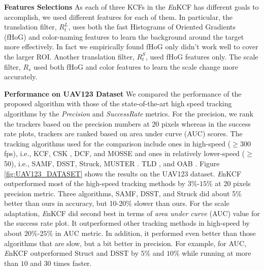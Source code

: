 \documentclass{bmvc2k}
\begin{document}
\textbf{Features Selections} As each of three KCFs in the {\it E}nKCF
has different goals to accomplish, we used different features for each
of them. In particular, the translation filter, $R_{t}^{L}$, uses both
the fast Histograms of Oriented Gradients (fHoG)
\cite{felzenszwalb2010object} and color-naming \cite{van2009learning}
features to learn the background around the target more
effectively. In fact we empirically found fHoG only didn't work well
to cover the larger ROI. Another translation filter, $R_{t}^{S}$, used
fHoG features only. The scale filter, $R_{s}$ used both fHoG and color
features to learn the scale change more accurately.

\textbf{Performance on UAV123 Dataset} We compared the performance of
the proposed algorithm with those of the state-of-the-art high speed
tracking algorithms by the \textit{Precision} and
\textit{Success\:Rate} metrics. For the precision, we rank the trackers
based on the precision numbers at 20 pixels whereas in the success
rate plots, trackers are ranked based on area under curve (AUC)
scores. The tracking algorithms used for the comparison include ones
in high-speed ($\geq$300 fps), i.e., KCF\cite{henriques2015high}, CSK
\cite{henriques2012exploiting}, DCF\cite{henriques2015high}, and
MOSSE\cite{bolme2010visual,henriques2015high} and ones in relatively
lower-speed ($\geq$50), i.e., SAMF\cite{li2014scale},
DSST\cite{danelljan2014accurate}, Struck\cite{hare2012efficient},
MUSTER \cite{hong2015multi}. TLD \cite{kalal2012tracking}, and OAB
\cite{zhang2012robust}. Figure \ref{fig:UAV123_DATASET} shows the
results on the UAV123 dataset. {\it E}nKCF outperformed most of the
high-speed tracking methods by $3\%$-$15\%$ at 20 pixels precision
metric. Three algorithms, SAMF, DSST, and Struck did about 5\% better
than ours in accuracy, but 10-20\% slower than ours. For the scale
adaptation, {\it E}nKCF did second best in terms of \textit{area under
  curve} (AUC) value for the success rate plot. It outperformed other
tracking methods in high-speed by about $20\%$-$25\%$ in AUC
metric. In addition, it performed even better than those algorithms
that are slow, but a bit better in precision. For example, for AUC,
{\it E}nKCF outperformed Struct and DSST by $5\%$ and $10\%$ while
running at more than $10$ and $30$ times faster.
\end{document}
